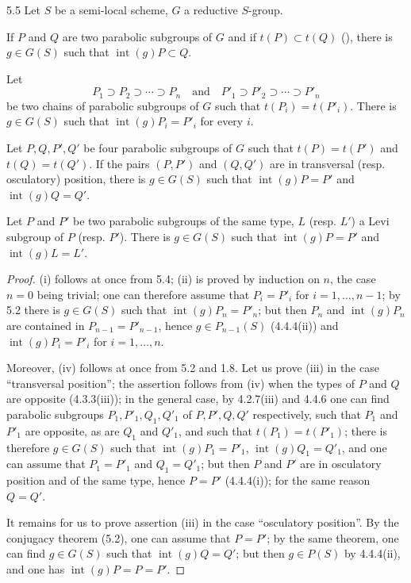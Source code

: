 \begin{corollary}{5.5}\label{XXVI.5.5}
Let $S$ be a semi-local scheme, $G$ a reductive $S$-group.
\begin{enumeratei}
\item If $P$ and $Q$ are two parabolic subgroups of $G$ and if $t(P)\subset t(Q)$ (), there is $g\in G(S)$ such that $\operatorname{int}(g)P\subset Q$.
\item Let
\[
 P_1\supset P_2\supset\cdots\supset P_n
 \quad\text{and}\quad P'_1\supset P'_2\supset\cdots\supset P'_n
\]
be two chains of parabolic subgroups of $G$ such that $t(P_i)=t(P'_i)$. There is $g\in G(S)$ such that $\operatorname{int}(g)P_i=P'_i$ for every $i$.
\item Let $P,Q,P',Q'$ be four parabolic subgroups of $G$ such that $t(P)=t(P')$ and $t(Q)=t(Q')$. If the pairs $(P,P')$ and $(Q,Q')$ are in transversal (resp. osculatory) position, there is $g\in G(S)$ such that $\operatorname{int}(g)P=P'$ and $\operatorname{int}(g)Q=Q'$.
\item Let $P$ and $P'$ be two parabolic subgroups of the same type, $L$ (resp. $L'$) a Levi subgroup of $P$ (resp. $P'$). There is $g\in G(S)$ such that $\operatorname{int}(g)P=P'$ and $\operatorname{int}(g)L=L'$.
\end{enumeratei}
\end{corollary}
\begin{proof}
(i) follows at once from 5.4; (ii) is proved by induction on $n$, the case $n=0$ being trivial; one can therefore assume that $P_i=P'_i$ for $i=1,\ldots,n-1$; by 5.2 there is $g\in G(S)$ such that $\operatorname{int}(g)P_n=P'_n$; but then $P_n$ and $\operatorname{int}(g)P_n$ are contained in $P_{n-1}=P'_{n-1}$, hence $g\in P_{n-1}(S)$ (4.4.4(ii)) and $\operatorname{int}(g)P_i=P'_i$ for $i=1,\ldots,n$.

Moreover, (iv) follows at once from 5.2 and 1.8. Let us prove (iii) in the case ``transversal position''; the assertion follows from (iv) when the types of $P$ and $Q$ are opposite (4.3.3(iii)); in the general case, by 4.2.7(iii) and 4.4.6 one can find parabolic subgroups $P_1,P'_1,Q_1,Q'_1$ of $P,P',Q,Q'$ respectively, such that $P_1$ and $P'_1$ are opposite, as are $Q_1$ and $Q'_1$, and such that $t(P_1)=t(P'_1)$; there is therefore $g\in G(S)$ such that $\operatorname{int}(g)P_1=P'_1$, $\operatorname{int}(g)Q_1=Q'_1$, and one can assume that $P_1=P'_1$ and $Q_1=Q'_1$; but then $P$ and $P'$ are in osculatory position and of the same type, hence $P=P'$ (4.4.4(i)); for the same reason $Q=Q'$.

It remains for us to prove assertion (iii) in the case ``osculatory position''. By the conjugacy theorem (5.2), one can assume that $P=P'$; by the same theorem, one can find $g\in G(S)$ such that $\operatorname{int}(g)Q=Q'$; but then $g\in P(S)$ by 4.4.4(ii), and one has $\operatorname{int}(g)P=P=P'$.
\end{proof}

